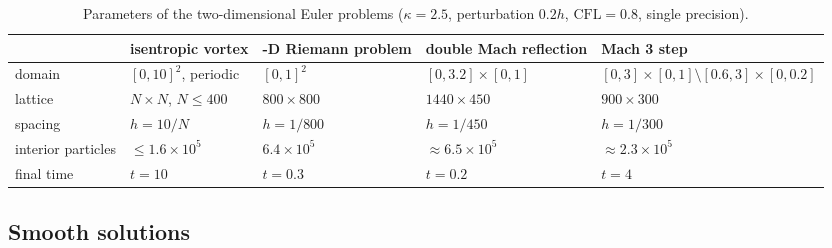 \documentclass[11pt,a4paper]{article}
\numberwithin{equation}{section}
\newcommand{\CFL}{\mathrm{CFL}}
\begin{document}
\begin{table}[!htbp]
\centering
\caption{Parameters of the two-dimensional Euler problems ($\kappa=2.5$, perturbation $0.2h$, $\CFL=0.8$, single precision).}\label{tab:setup}
\footnotesize\setlength{\tabcolsep}{4pt}
\begin{tabular}{>{\raggedright\arraybackslash}p{2.3cm}>{\raggedright\arraybackslash}p{2.6cm}>{\raggedright\arraybackslash}p{2.6cm}>{\raggedright\arraybackslash}p{2.6cm}>{\raggedright\arraybackslash}p{3.6cm}}
\toprule
& isentropic vortex & 2-D Riemann problem & double Mach reflection & Mach 3 step\\
\midrule
domain & $[0,10]^2$, periodic & $[0,1]^2$ & $[0,3.2]\times[0,1]$ & $[0,3]\times[0,1]\setminus[0.6,3]\times[0,0.2]$\\
lattice & $N\times N$, $N\le400$ & $800\times800$ & $1440\times450$ & $900\times300$\\
spacing & $h=10/N$ & $h=1/800$ & $h=1/450$ & $h=1/300$\\
interior particles & $\le1.6\times10^5$ & $6.4\times10^5$ & $\approx6.5\times10^5$ & $\approx2.3\times10^5$\\
final time & $t=10$ & $t=0.3$ & $t=0.2$ & $t=4$\\
\bottomrule
\end{tabular}
\end{table}

\subsection{Smooth solutions}\label{sec:smooth}
\end{document}

